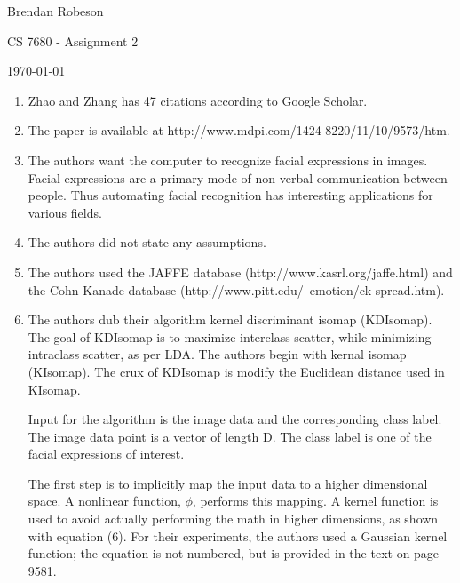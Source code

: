 \documentclass[11pt]{article}
\begin{document}
\noindent Brendan Robeson

\noindent CS 7680 - Assignment 2

\noindent \today

\medskip

\begin{enumerate}
    \item Zhao and Zhang \cite{s111009573} has 47 citations according to Google
        Scholar.

    \item The paper is available at
        http://www.mdpi.com/1424-8220/11/10/9573/htm.

    \item The authors want the computer to recognize facial expressions in
        images. Facial expressions are a primary mode of non-verbal
        communication between people. Thus automating facial recognition has
        interesting applications for various fields.

    \item The authors did not state any assumptions.

    \item The authors used the JAFFE database (http://www.kasrl.org/jaffe.html)
        and the Cohn-Kanade database
        (http://www.pitt.edu/~emotion/ck-spread.htm).

    \item The authors dub their algorithm kernel discriminant isomap (KDIsomap).
        The goal of KDIsomap is to maximize interclass scatter, while minimizing
        intraclass scatter, as per LDA. The authors begin with kernal isomap
        (KIsomap). The crux of KDIsomap is modify the Euclidean distance used in
        KIsomap.

        Input for the algorithm is the image data and the corresponding class
        label. The image data point is a vector of length D. The class label is
        one of the facial expressions of interest.

        The first step is to implicitly map the input data to a higher dimensional
        space. A nonlinear function, \(\phi\), performs this mapping. A kernel
        function is used to avoid actually performing the math in higher
        dimensions, as shown with equation (6). For their experiments, the
        authors used a Gaussian kernel function; the equation is not numbered,
        but is provided in the text on page 9581.


\end{enumerate}
\end{document}
